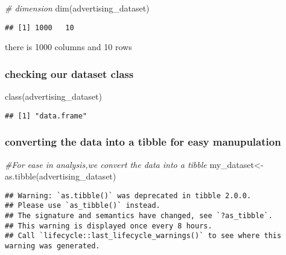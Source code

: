 \documentclass[
]{article}
\newenvironment{Shaded}{\begin{snugshade}}{\end{snugshade}}
\newcommand{\CommentTok}[1]{\textcolor[rgb]{0.56,0.35,0.01}{\textit{#1}}}
\newcommand{\FunctionTok}[1]{\textcolor[rgb]{0.00,0.00,0.00}{#1}}
\newcommand{\NormalTok}[1]{#1}
\newcommand{\OtherTok}[1]{\textcolor[rgb]{0.56,0.35,0.01}{#1}}
\begin{document}
\begin{Shaded}
\begin{Highlighting}[]
\CommentTok{\# dimension}
\FunctionTok{dim}\NormalTok{(advertising\_dataset)}
\end{Highlighting}
\end{Shaded}

\begin{verbatim}
## [1] 1000   10
\end{verbatim}

there is 1000 columns and 10 rows

\hypertarget{checking-our-dataset-class}{%
\subsubsection{checking our dataset
class}\label{checking-our-dataset-class}}

\begin{Shaded}
\begin{Highlighting}[]
\FunctionTok{class}\NormalTok{(advertising\_dataset)}
\end{Highlighting}
\end{Shaded}

\begin{verbatim}
## [1] "data.frame"
\end{verbatim}

\hypertarget{converting-the-data-into-a-tibble-for-easy-manupulation}{%
\subsubsection{converting the data into a tibble for easy
manupulation}\label{converting-the-data-into-a-tibble-for-easy-manupulation}}

\begin{Shaded}
\begin{Highlighting}[]
\CommentTok{\#For ease in analysis,we convert the data into a tibble}
\NormalTok{my\_dataset}\OtherTok{\textless{}{-}}\FunctionTok{as.tibble}\NormalTok{(advertising\_dataset) }
\end{Highlighting}
\end{Shaded}

\begin{verbatim}
## Warning: `as.tibble()` was deprecated in tibble 2.0.0.
## Please use `as_tibble()` instead.
## The signature and semantics have changed, see `?as_tibble`.
## This warning is displayed once every 8 hours.
## Call `lifecycle::last_lifecycle_warnings()` to see where this warning was generated.
\end{verbatim}
\end{document}
